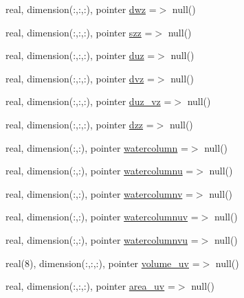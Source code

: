 \begin{DoxyCompactItemize}
\item 
real, dimension(\+:,\+:,\+:), pointer \mbox{\hyperlink{structmodulehydrodynamic_1_1t__external_a64fa084d34481eb0b05c46aefd36dc81}{dwz}} =$>$ null()
\item 
real, dimension(\+:,\+:,\+:), pointer \mbox{\hyperlink{structmodulehydrodynamic_1_1t__external_a894bbeead029e5e1aab752c3ac5f1a60}{szz}} =$>$ null()
\item 
real, dimension(\+:,\+:,\+:), pointer \mbox{\hyperlink{structmodulehydrodynamic_1_1t__external_ae6cbccf619e6426a7b54cc0397a4f7b7}{duz}} =$>$ null()
\item 
real, dimension(\+:,\+:,\+:), pointer \mbox{\hyperlink{structmodulehydrodynamic_1_1t__external_a870c2279069ff8a3aa9f6c154bbaddaa}{dvz}} =$>$ null()
\item 
real, dimension(\+:,\+:,\+:), pointer \mbox{\hyperlink{structmodulehydrodynamic_1_1t__external_af7fa66b099f679fe565f3a5a8753e180}{duz\+\_\+vz}} =$>$ null()
\item 
real, dimension(\+:,\+:,\+:), pointer \mbox{\hyperlink{structmodulehydrodynamic_1_1t__external_afe76b5810dcc8fa17aa8adc0ede6a3dd}{dzz}} =$>$ null()
\item 
real, dimension(\+:,\+:), pointer \mbox{\hyperlink{structmodulehydrodynamic_1_1t__external_a3e711cb8ffbd1f70252c08fd9c27740a}{watercolumn}} =$>$ null()
\item 
real, dimension(\+:,\+:), pointer \mbox{\hyperlink{structmodulehydrodynamic_1_1t__external_a96f16c1dd1881738cd8e8677ce21c6bd}{watercolumnu}} =$>$ null()
\item 
real, dimension(\+:,\+:), pointer \mbox{\hyperlink{structmodulehydrodynamic_1_1t__external_a311232a07dabcfe5812352aea6fb51d3}{watercolumnv}} =$>$ null()
\item 
real, dimension(\+:,\+:), pointer \mbox{\hyperlink{structmodulehydrodynamic_1_1t__external_a5eeb78d39243754928a50b6ed87cf64a}{watercolumnuv}} =$>$ null()
\item 
real, dimension(\+:,\+:), pointer \mbox{\hyperlink{structmodulehydrodynamic_1_1t__external_ad857173eda1cd9b8714b3b07d533b64e}{watercolumnvu}} =$>$ null()
\item 
real(8), dimension(\+:,\+:,\+:), pointer \mbox{\hyperlink{structmodulehydrodynamic_1_1t__external_ae90b603a01e6e3ddd0f18284ac39b995}{volume\+\_\+uv}} =$>$ null()
\item 
real, dimension(\+:,\+:,\+:), pointer \mbox{\hyperlink{structmodulehydrodynamic_1_1t__external_a0c66b27addce3cd485572c2f3940e12d}{area\+\_\+uv}} =$>$ null()
\item 

\end{DoxyCompactItemize}

